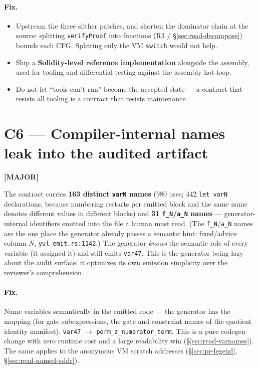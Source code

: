 \paragraph{Fix.}
\begin{itemize}[leftmargin=1.4em,itemsep=2pt]
\item Upstream the three slither patches, and shorten the
  dominator chain at the source: splitting \texttt{verifyProof}
  into functions (R3 / \S\ref{sec:read-decompose}) bounds each
  CFG. Splitting only the VM \texttt{switch} would not help.
\item Ship a \textbf{Solidity-level reference implementation}
  alongside the assembly, used for tooling and differential
  testing against the assembly hot loop.
\item Do not let ``tools can't run'' become the accepted state ---
  a contract that resists all tooling is a contract that resists
  maintenance.
\end{itemize}

\section{C6 --- Compiler-internal names leak into the audited artifact}
\label{sec:c6-names}
\textcolor{mathpurple}{\textbf{[MAJOR]}} 

The contract carries \textbf{163 distinct \texttt{varN} names}
(980 uses; 442 \texttt{let varN} declarations, because numbering
restarts per emitted block and the same name denotes different
values in different blocks) and
\textbf{31 \texttt{f\_N}/\texttt{a\_N} names} --- generator-internal
identifiers emitted into the file a human must read. (The
\texttt{f\_N}/\texttt{a\_N} names are the one place the generator
already passes a semantic hint: fixed/advice column $N$,
\texttt{yul\_emit.rs:1142}.) The
generator \emph{knows} the semantic role of every variable (it
assigned it) and still emits \texttt{var47}. This is the
generator being lazy about the audit surface: it optimizes its own
emission simplicity over the reviewer's comprehension.

\paragraph{Fix.}
Name variables semantically in the emitted code --- the generator
has the mapping (for gate subexpressions, the gate and constraint
names of the quotient identity manifest). \texttt{var47} $\to$
\texttt{perm\_\allowbreak{}z\_\allowbreak{}numerator\_\allowbreak{}term}. This is a pure codegen change
with zero runtime cost and a large readability win (\S\ref{sec:read-varnames}). The same
applies to the anonymous VM scratch addresses
(\S\ref{sec:pr-legend}, \S\ref{sec:read-named-addr}).

